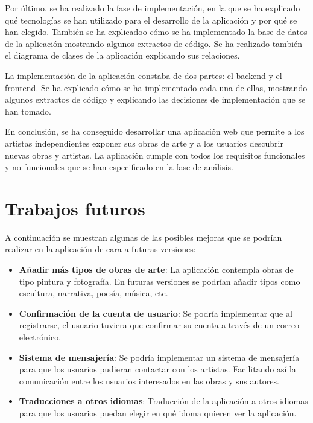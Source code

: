 \vspace{0.5cm}

Por último, se ha realizado la fase de implementación, en la que se ha explicado qué
tecnologías se han utilizado para el desarrollo de la aplicación y por qué se han
elegido. También se ha explicadoo cómo se ha implementado la base de datos de la aplicación
mostrando algunos extractos de código. Se ha realizado también el diagrama de clases
de la aplicación explicando sus relaciones.

La implementación de la aplicación constaba de dos partes: el backend y el frontend. Se ha
explicado cómo se ha implementado cada una de ellas, mostrando algunos extractos de código
y explicando las decisiones de implementación que se han tomado.

\vspace{0.5cm}

En conclusión, se ha conseguido desarrollar una aplicación web que permite a los artistas
independientes exponer sus obras de arte y a los usuarios descubrir nuevas obras y artistas.
La aplicación cumple con todos los requisitos funcionales y no funcionales que se han
especificado en la fase de análisis.

\section{Trabajos futuros}

A continuación se muestran algunas de las posibles mejoras que se podrían realizar en
la aplicación de cara a futuras versiones:

\begin{itemize}
    \item \textbf{Añadir más tipos de obras de arte}: La aplicación contempla obras de tipo
    pintura y fotografía. En futuras versiones se podrían añadir tipos como escultura,
    narrativa, poesía, música, etc.
    \item \textbf{Confirmación de la cuenta de usuario}: Se podría implementar que al
    registrarse, el usuario tuviera que confirmar su cuenta a través de un correo electrónico.
    \item \textbf{Sistema de mensajería}: Se podría implementar un sistema de mensajería
    para que los usuarios pudieran contactar con los artistas. Facilitando así la comunicación
    entre los usuarios interesados en las obras y sus autores.
    \item \textbf{Traducciones a otros idiomas}: Traducción de la aplicación a otros idiomas
    para que los usuarios puedan elegir en qué idoma quieren ver la aplicación.
\end{itemize}